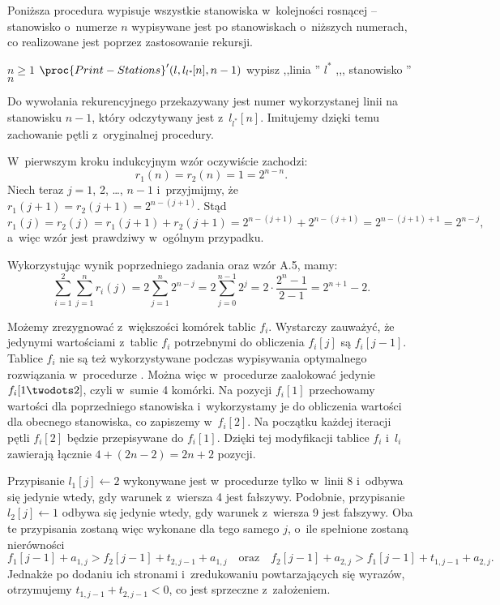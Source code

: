 
\exercise %
Poniższa procedura wypisuje wszystkie stanowiska w~kolejności rosnącej -- stanowisko o~numerze $n$ wypisywane jest po stanowiskach o~niższych numerach, co realizowane jest poprzez zastosowanie rekursji.
\begin{codebox}
\li	\If $n\ge1$
\li	\Then $\proc{Print-Stations}'(l,l_{l^*\!}[n],n-1)$
\li		wypisz ,,linia '' $l^*\!$ ,,{}, stanowisko '' $n$
	\End
\end{codebox}
Do wywołania rekurencyjnego przekazywany jest numer wykorzystanej linii na stanowisku $n-1$, który odczytywany jest z~$l_{l^*\!}[n]$.
Imitujemy dzięki temu zachowanie pętli z~oryginalnej procedury.

\exercise %
W~pierwszym kroku indukcyjnym wzór oczywiście zachodzi:
\[
	r_1(n) = r_2(n) = 1 = 2^{n-n}.
\]
Niech teraz $j=1$, 2, \dots, $n-1$ i~przyjmijmy, że $r_1(j+1)=r_2(j+1)=2^{n-(j+1)}$.
Stąd
\[
	r_1(j) = r_2(j) = r_1(j+1)+r_2(j+1) = 2^{n-(j+1)}+2^{n-(j+1)} = 2^{n-(j+1)+1} = 2^{n-j},
\]
a~więc wzór jest prawdziwy w~ogólnym przypadku.

\exercise %
Wykorzystując wynik poprzedniego zadania oraz wzór A.5, mamy:
\[
	\sum_{i=1}^2\sum_{j=1}^nr_i(j) = 2\sum_{j=1}^n2^{n-j} = 2\sum_{j=0}^{n-1}2^j = 2\cdot\frac{2^n-1}{2-1} = 2^{n+1}-2.
\]

\exercise %
Możemy zrezygnować z~większości komórek tablic $f_i$.
Wystarczy zauważyć, że jedynymi wartościami z~tablic $f_i$ potrzebnymi do obliczenia $f_i[j]$ są $f_i[j-1]$.
Tablice $f_i$ nie są też wykorzystywane podczas wypisywania optymalnego rozwiązania w~procedurze .
Można więc w~procedurze  zaalokować jedynie $f_i[1\twodots2]$, czyli w~sumie 4 komórki.
Na pozycji $f_i[1]$ przechowamy wartości dla poprzedniego stanowiska i~wykorzystamy je do obliczenia wartości dla obecnego stanowiska, co zapiszemy w~$f_i[2]$.
Na początku każdej iteracji pętli  $f_i[2]$ będzie przepisywane do $f_i[1]$.
Dzięki tej modyfikacji tablice $f_i$ i~$l_i$ zawierają łącznie $4+(2n-2)=2n+2$ pozycji.

\exercise %
Przypisanie $l_1[j]\gets2$ wykonywane jest w~procedurze  tylko w~linii 8 i~odbywa się jedynie wtedy, gdy warunek z~wiersza 4 jest fałszywy.
Podobnie, przypisanie $l_2[j]\gets1$ odbywa się jedynie wtedy, gdy warunek z~wiersza 9 jest fałszywy.
Oba te przypisania zostaną więc wykonane dla tego samego $j$, o~ile spełnione zostaną nierówności
\[
	f_1[j-1]+a_{1,j}>f_2[j-1]+t_{2,j-1}+a_{1,j} \quad\text{oraz}\quad f_2[j-1]+a_{2,j}>f_1[j-1]+t_{1,j-1}+a_{2,j}.
\]
Jednakże po dodaniu ich stronami i~zredukowaniu powtarzających się wyrazów, otrzymujemy $t_{1,j-1}+t_{2,j-1}<0$, co jest sprzeczne z~założeniem.
